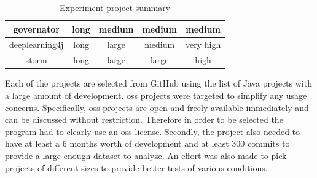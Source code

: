 \begin{table}
\begin{center}
\begin{tabular}{|c|c|c|c|c|}
        governator & long & medium & medium & medium \\
        \hline
        deeplearning4j & long & large & medium & very high \\
        \hline
        storm & long & large & large & high \\
        \hline
    \end{tabular}
\end{center}
\caption{Experiment project summary}
\label{tab:project_size_summary}
\end{table}

Each of the projects are selected from GitHub using the list of Java projects with a large amount of development. \gls{oss} projects were targeted to simplify any usage concerns. Specifically, \gls{oss} projects are open and freely available immediately and can be discussed without restriction. Therefore in order to be selected the program had to clearly use an \gls{oss} license. Secondly, the project also needed to have at least a 6 months worth of development and at least 300 commits to provide a large enough dataset to analyze. An effort was also made to pick projects of different sizes to provide better tests of various conditions.

